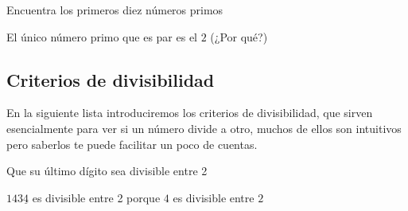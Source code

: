 \documentclass[11pt]{scrartcl}
\begin{document}
\begin{exercise*}
    Encuentra los primeros diez números primos
\end{exercise*}
\begin{ejemplo*}
    El único número primo que es par es el $2$ (¿Por qué?)
\end{ejemplo*}
\subsection{Criterios de divisibilidad}
En la siguiente lista introduciremos los criterios de divisibilidad, que sirven esencialmente para ver si un número divide a otro, muchos de ellos son intuitivos pero saberlos te puede facilitar un poco de cuentas.

\begin{criterio*}
    Que su último dígito sea divisible entre 2
\end{criterio*}
\begin{ejemplo*}
       $143\underline{4}$ es divisible entre 2 porque $4$ es divisible entre $2$
   \end{ejemplo*}
\end{document}
